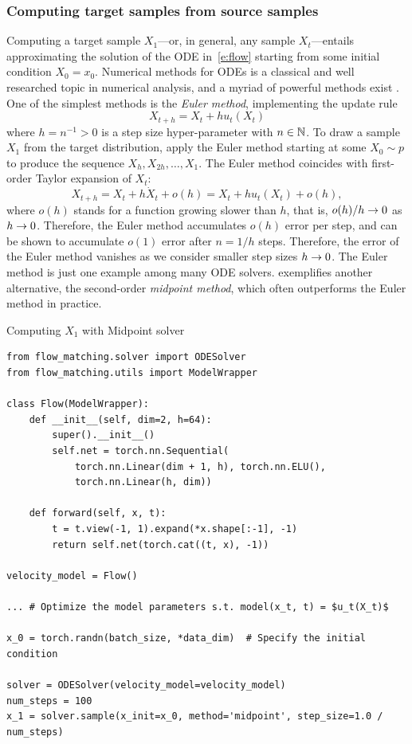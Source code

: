 \documentclass{fairmeta}
\numberwithin{equation}{section}
\begin{document}
\subsubsection{Computing target samples from source samples}
Computing a target sample $X_1$---or, in general, any sample $X_t$---entails approximating the solution of the ODE in~\cref{e:flow} starting from some initial condition $X_0=x_0$.
Numerical methods for ODEs is a classical and well researched topic in numerical analysis, and a myriad of powerful methods exist \citep{iserles2009first}.
One of the simplest methods is the \emph{Euler method}, implementing the update rule
\begin{equation}\label{e:euler_method}
    X_{t+h} = X_t + h u_t(X_t) %
\end{equation}
where $h=n^{-1}>0$ is a step size hyper-parameter with $n \in \mathbb N$.
To draw a sample $X_1$ from the target distribution, apply the Euler method starting at some $X_0 \sim p$ to produce the sequence $X_h,X_{2h},\ldots,X_1$.
The Euler method coincides with first-order Taylor expansion of $X_t$:
$$X_{t+h}=X_t + h \dot{X}_t + o(h)=X_t + h u_t(X_t) + o(h),$$
where $o(h)$ stands for a function growing slower than $h$, that is, $o(h)/h \rightarrow 0$ as $h\rightarrow 0$.
Therefore, the Euler method accumulates $o(h)$ error per step, and can be shown to accumulate $o(1)$ error after $n=1/h$ steps.
Therefore, the error of the Euler method vanishes as we consider smaller step sizes $h\rightarrow 0$.
The Euler method is just one example among many ODE solvers.
 exemplifies another alternative, the second-order \emph{midpoint method}, which often outperforms the Euler method in practice.

\begin{pbox}[label={ex:euler_method}]{Computing $X_1$ with Midpoint solver}
\begin{verbatim}
from flow_matching.solver import ODESolver
from flow_matching.utils import ModelWrapper

class Flow(ModelWrapper):
    def __init__(self, dim=2, h=64):
        super().__init__()
        self.net = torch.nn.Sequential(
            torch.nn.Linear(dim + 1, h), torch.nn.ELU(),
            torch.nn.Linear(h, dim))

    def forward(self, x, t):
        t = t.view(-1, 1).expand(*x.shape[:-1], -1)
        return self.net(torch.cat((t, x), -1))

velocity_model = Flow()

... # Optimize the model parameters s.t. model(x_t, t) = $u_t(X_t)$

x_0 = torch.randn(batch_size, *data_dim)  # Specify the initial condition

solver = ODESolver(velocity_model=velocity_model)
num_steps = 100
x_1 = solver.sample(x_init=x_0, method='midpoint', step_size=1.0 / num_steps)
\end{verbatim}
\end{pbox}
\end{document}

